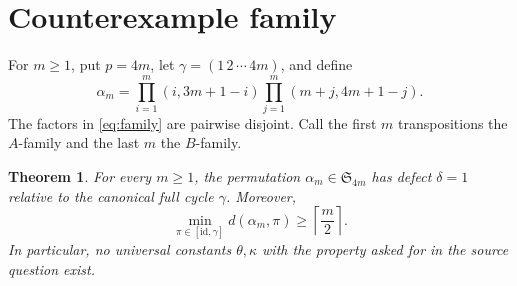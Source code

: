 \documentclass[11pt]{article}
\newtheorem{theorem}{Theorem}
\newcommand{\id}{\mathrm{id}}
\begin{document}
\section{Counterexample family}

For $m\geq1$, put $p=4m$, let $\gamma=(1\,2\,\cdots\,4m)$, and define
\begin{equation}\label{eq:family}
\alpha_m=
\prod_{i=1}^{m}(i,3m+1-i)
\prod_{j=1}^{m}(m+j,4m+1-j).
\end{equation}
The factors in \eqref{eq:family} are pairwise disjoint.  Call the first $m$
transpositions the $A$-family and the last $m$ the $B$-family.

\begin{theorem}\label{thm:main}
For every $m\geq1$, the permutation $\alpha_m\in\mathfrak S_{4m}$ has defect
$\delta=1$ relative to the canonical full cycle $\gamma$.  Moreover,
\[
\min_{\pi\in[\id,\gamma]}d(\alpha_m,\pi)
\geq \left\lceil\frac m2\right\rceil.
\]
In particular, no universal constants $\theta,\kappa$ with the property asked
for in the source question exist.
\end{theorem}
\end{document}
